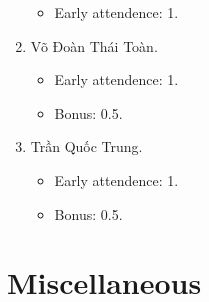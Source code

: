 \documentclass{article}
\begin{document}
\begin{enumerate}
	\begin{itemize}
		\item Early attendence: 1.
	\end{itemize}
	\item {\sc Võ Đoàn Thái Toàn.}
	\begin{itemize}
		\item Early attendence: 1.
		\item Bonus: 0.5.
	\end{itemize}
	\item {\sc Trần Quốc Trung.}
	\begin{itemize}
		\item Early attendence: 1.
		\item Bonus: 0.5.
	\end{itemize}
\end{enumerate}


\section{Miscellaneous}


\printbibliography[heading=bibintoc]
	
\end{document}
